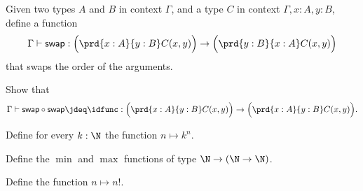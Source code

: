 \begin{exercises}
\begin{subexenum}
\begin{prooftree}
\end{prooftree}
\end{subexenum}
\item 
\begin{subexenum}
\item Given two types $A$ and $B$ in context $\Gamma$, and a type $C$ in context $\Gamma,x:A,y:B$, define a function
\begin{equation*}
\Gamma\vdash \mathsf{swap}:\Big(\prd{x:A}{y:B}C(x,y)\Big)\to\Big(\prd{y:B}{x:A}C(x,y)\Big)
\end{equation*}
that swaps the order of the arguments.
\item Show that
\begin{equation*}
\Gamma\vdash \mathsf{swap}\circ\mathsf{swap}\jdeq\idfunc:\Big(\prd{x:A}{y:B}C(x,y)\Big)\to \Big(\prd{x:A}{y:B}C(x,y)\Big).
\end{equation*}
\end{subexenum}
\item Define for every $k:\N$ the function $n\mapsto k^n$. 
\item Define the $\min$ and $\max$ functions of type $\N\to(\N\to\N)$.
\item Define the function $n\mapsto n!$. 
\end{exercises}
